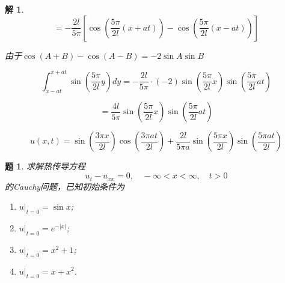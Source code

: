 \documentclass[12pt,a4paper]{article}
\newtheorem{problem}{题}
\newtheorem*{solution}{解}
\begin{document}
\begin{solution}
	\begin{equation*}
		= -\frac{2l}{5\pi} \left[ \cos\left( \frac{5\pi}{2l}(x + at) \right) - \cos\left( \frac{5\pi}{2l}(x - at) \right) \right]
	\end{equation*}
	



	由于$	\cos(A + B) - \cos(A - B) = -2 \sin A \sin B$

	
	\begin{equation*}
		\int_{x - at}^{x + at} \sin\left( \frac{5\pi}{2l} y \right) dy = -\frac{2l}{5\pi} \cdot (-2) \sin\left( \frac{5\pi}{2l} x \right) \sin\left( \frac{5\pi}{2l} at \right)
	\end{equation*}
	
	\begin{equation*}
		= \frac{4l}{5\pi} \sin\left( \frac{5\pi}{2l} x \right) \sin\left( \frac{5\pi}{2l} at \right)
	\end{equation*}
	
	\begin{equation*}
	 	u(x,t) =\sin\left( \frac{3\pi x}{2l} \right) \cos\left( \frac{3\pi at}{2l} \right) + \frac{2l}{5\pi a} \sin\left( \frac{5\pi x}{2l} \right) \sin\left( \frac{5\pi at}{2l} \right)
	\end{equation*}
	
	
	
	
	
	
\end{solution}




\newpage
\begin{problem}
	求解热传导方程
	\[
	u_t - u_{xx} = 0, \quad -\infty < x < \infty, \quad t > 0
	\]
	的Cauchy问题，已知初始条件为
	\begin{enumerate}[label=(\arabic*)]
		\item \( u|_{t=0} = \sin x \);
		\item \( u|_{t=0} = e^{-|x|} \);
		\item \( u|_{t=0} = x^2 + 1 \);
		\item \( u|_{t=0} = x + x^2 \).
	\end{enumerate}
\end{problem}
\end{document}
